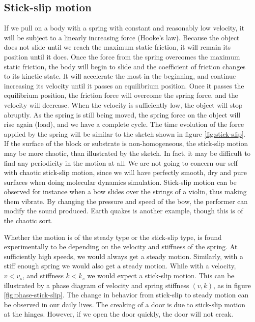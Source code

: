 \documentclass[twoside,english]{uiofysmaster}
\begin{document}
\subsection{Stick-slip motion}
If we pull on a body with a spring with constant and reasonably low velocity, it will be subject to a linearly increasing force (Hooke's law). 
Because the object does not slide until we reach the maximum static friction, it will remain its position until it does.
Once the force from the spring overcomes the maximum static friction, the body will begin to slide and the coefficient of friction changes to its kinetic state.
It will accelerate the most in the beginning, and continue increasing its velocity until it passes an equilibrium position.
Once it passes the equilibrium position, the friction force will overcome the spring force, and the velocity will decrease. 
When the velocity is sufficiently low, the object will stop abruptly. 
As the spring is still being moved, the spring force on the object will rise again (load), and we have a complete cycle.
The time evolution of the force applied by the spring will be similar to the sketch shown in figure \ref{fig:stick-slip}.
If the surface of the block or substrate is non-homogeneous, the stick-slip motion may be more chaotic, than illustrated by the sketch. 
In fact, it may be difficult to find any periodicity in the motion at all. 
We are not going to concern our self with chaotic stick-slip motion, since we will have perfectly smooth, dry and pure surfaces when doing molecular dynamics simulation.  
Stick-slip motion can be observed for instance when a bow slides over the strings of a violin, thus making them vibrate. 
By changing the pressure and speed of the bow, the performer can modify the sound produced. 
Earth quakes is another example, though this is of the chaotic sort.

Whether the motion is of the steady type or the stick-slip type, is found experimentally to be depending on the velocity and  stiffness of the spring.
At sufficiently high speeds, we would always get a steady motion. 
Similarly, with a stiff enough spring we would also get a steady motion. 
While with a velocity, $v<v_s$, and stiffness $k<k_s$ we would expect a stick-slip motion.
This can be illustrated by a phase diagram of velocity and spring stiffness $(v,k)$, as in figure \ref{fig:phase-stick-slip}.
The change in behavior from stick-slip to steady motion can be observed in our daily lives. 
The creaking of a door is due to stick-slip motion at the hinges.
However, if we open the door quickly, the door will not creak.
  
\end{document}
